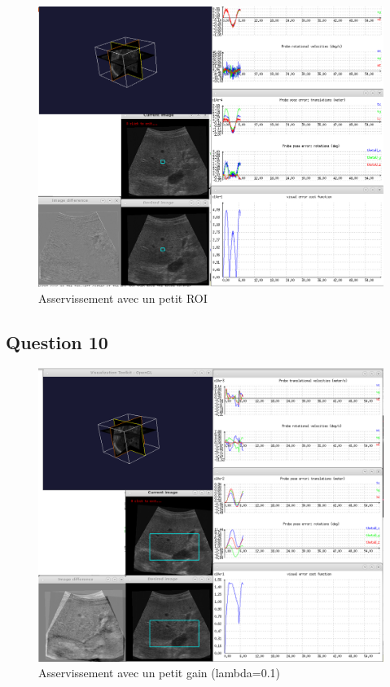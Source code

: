 \documentclass[a4paper,11pt]{article}
\begin{document}
\begin{figure}[H]
    \centering
    \includegraphics[width=1.0\textwidth]{./images/q9_small.png}
    \caption{Asservissement avec un petit ROI}
    \label{smallRoi}
\end{figure}

\subsection{Question 10}
\begin{figure}[H]
    \centering
    \includegraphics[width=1.0\textwidth]{./images/q10_small.png}
    \caption{Asservissement avec un petit gain (lambda=0.1)}
    \label{smallGain}
\end{figure}
\end{document}
